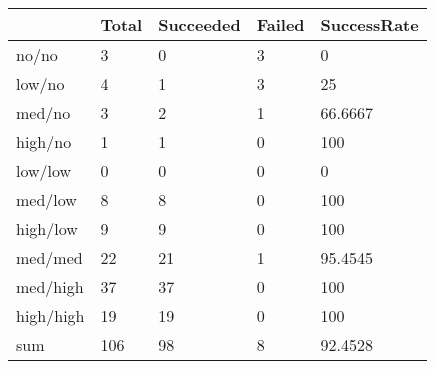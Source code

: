 \begin{tabular}{lllll}
& Total & Succeeded & Failed & SuccessRate \\ 
\hline 
no/no & 3 & 0 & 3 & 0 \\ 
low/no & 4 & 1 & 3 & 25 \\ 
med/no & 3 & 2 & 1 & 66.6667 \\ 
high/no & 1 & 1 & 0 & 100 \\ 
low/low & 0 & 0 & 0 & 0 \\ 
med/low & 8 & 8 & 0 & 100 \\ 
high/low & 9 & 9 & 0 & 100 \\ 
med/med & 22 & 21 & 1 & 95.4545 \\ 
med/high & 37 & 37 & 0 & 100 \\ 
high/high & 19 & 19 & 0 & 100 \\ 
sum & 106 & 98 & 8 & 92.4528 \\ 
\hline 
\end{tabular}